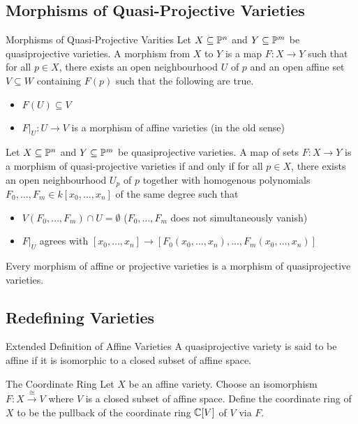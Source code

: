 \documentclass[a4paper]{article}
\begin{document}
\subsection{Morphisms of Quasi-Projective Varieties}
\begin{defn}{Morphisms of Quasi-Projective Varities}{} Let $X\subseteq\mathbb{P}^n$ and $Y\subseteq\mathbb{P}^m$ be quasiprojective varieties. A morphism from $X$ to $Y$ is a map $F:X\to Y$ such that for all $p\in X$, there exists an open neighbourhood $U$ of $p$ and an open affine set $V\subseteq W$ containing $F(p)$ such that the following are true. 
\begin{itemize}
\item $F(U)\subseteq V$
\item $F|_U:U\to V$ is a morphism of affine varieties (in the old sense)
\end{itemize}
\end{defn}

\begin{prp}{}{} Let $X\subseteq\mathbb{P}^n$ and $Y\subseteq\mathbb{P}^m$ be quasiprojective varieties. A map of sets $F:X\to Y$ is a morphism of quasi-projective varieties if and only if for all $p\in X$, there exists an open neighbourhood $U_p$ of $p$ together with homogenous polynomials $F_0,\dots,F_m\in k[x_0,\dots,x_n]$ of the same degree such that 
\begin{itemize}
\item $V(F_0,\dots,F_m)\cap U=\emptyset$ ($F_0,\dots,F_m$ does not simultaneously vanish)
\item $F|_U$ agrees with $[x_0,\dots,x_n]\to[F_0(x_0,\dots,x_n),\dots,F_m(x_0,\dots,x_n)]$
\end{itemize}
\end{prp}

\begin{lmm}{}{} Every morphism of affine or projective varieties is a morphism of quasiprojective varieties. 
\end{lmm}

\subsection{Redefining Varieties}
\begin{defn}{Extended Definition of Affine Varieties}{} A quasiprojective variety is said to be affine if it is isomorphic to a closed subset of affine space. 
\end{defn}

\begin{defn}{The Coordinate Ring}{} Let $X$ be an affine variety. Choose an isomorphism $F:X\overset{\cong}{\longrightarrow}V$ where $V$ is a closed subset of affine space. Define the coordinate ring of $X$ to be the pullback of the coordinate ring $\mathbb{C}[V]$ of $V$ via $F$. 
\end{defn}
\end{document}
